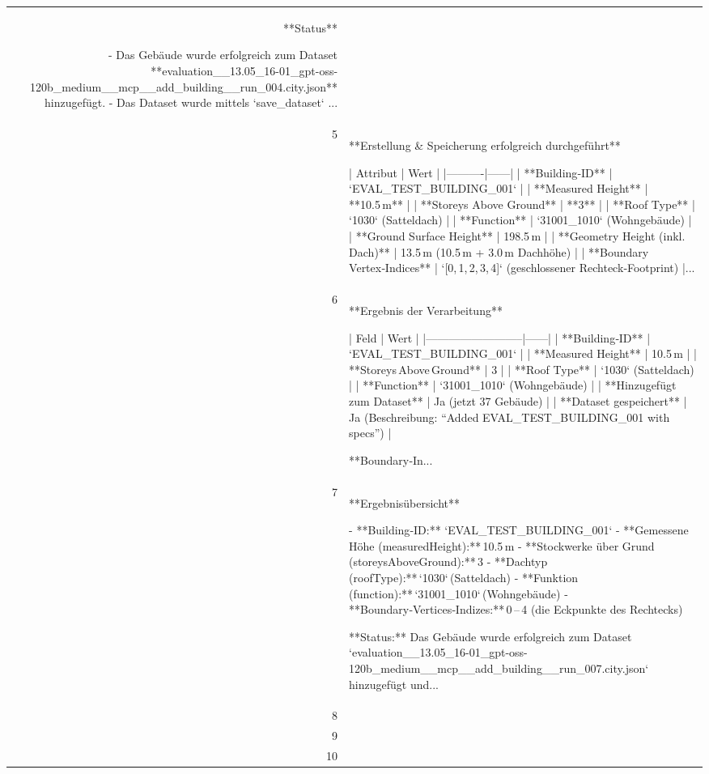 \documentclass[a4paper,11pt]{article}
\begin{document}
\begin{table}[ht]
\begin{tabular}{r p{12cm}}
**Status**

- Das Gebäude wurde erfolgreich zum Dataset **evaluation\_\_13.05\_16-01\_gpt-oss-120b\_medium\_\_mcp\_\_add\_building\_\_run\_004.city.json** hinzugefügt.  
- Das Dataset wurde mittels `save\_dataset` ... \\
5 & **Erstellung \& Speicherung erfolgreich durchgeführt**

| Attribut | Wert |
|----------|------|
| **Building‑ID** | `EVAL\_TEST\_BUILDING\_001` |
| **Measured Height** | **10.5 m** |
| **Storeys Above Ground** | **3** |
| **Roof Type** | `1030` (Satteldach) |
| **Function** | `31001\_1010` (Wohngebäude) |
| **Ground Surface Height** | 198.5 m |
| **Geometry Height (inkl. Dach)** | 13.5 m (10.5 m + 3.0 m Dachhöhe) |
| **Boundary Vertex‑Indices** | `[0, 1, 2, 3, 4]` (geschlossener Rechteck‑Footprint) |... \\
6 & **Ergebnis der Verarbeitung**

| Feld                     | Wert |
|--------------------------|------|
| **Building‑ID**          | `EVAL\_TEST\_BUILDING\_001` |
| **Measured Height**      | 10.5 m |
| **Storeys Above Ground** | 3 |
| **Roof Type**            | `1030` (Satteldach) |
| **Function**             | `31001\_1010` (Wohngebäude) |
| **Hinzugefügt zum Dataset** | Ja (jetzt 37 Gebäude) |
| **Dataset gespeichert** | Ja (Beschreibung: “Added EVAL\_TEST\_BUILDING\_001 with specs”) |

**Boundary‑In... \\
7 & **Ergebnisübersicht**

- **Building‑ID:** `EVAL\_TEST\_BUILDING\_001`  
- **Gemessene Höhe (measuredHeight):** 10.5 m  
- **Stockwerke über Grund (storeysAboveGround):** 3  
- **Dachtyp (roofType):** `1030` (Satteldach)  
- **Funktion (function):** `31001\_1010` (Wohngebäude)  
- **Boundary‑Vertices‑Indizes:** 0 – 4 (die Eckpunkte des Rechtecks)  

**Status:** Das Gebäude wurde erfolgreich zum Dataset `evaluation\_\_13.05\_16-01\_gpt-oss-120b\_medium\_\_mcp\_\_add\_building\_\_run\_007.city.json` hinzugefügt und... \\
8 &  \\
9 &  \\
10 &  \\
\hline
\end{tabular}
\end{table}

\clearpage
\end{document}

